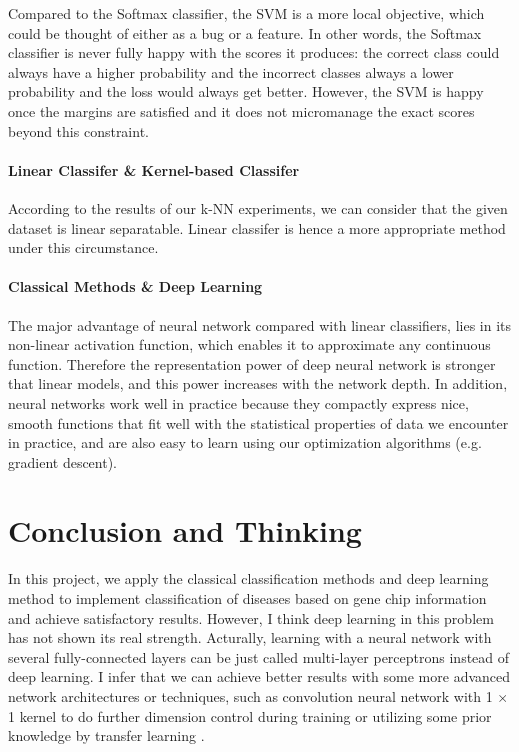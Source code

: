 \documentclass[10pt,twocolumn,letterpaper]{article}
\begin{document}
	Compared to the Softmax classifier, the SVM is a more local objective, which could be thought of either as a bug or a feature. In other words, the Softmax classifier is never fully happy with the scores it produces: the correct class could always have a higher probability and the incorrect classes always a lower probability and the loss would always get better. However, the SVM is happy once the margins are satisfied and it does not micromanage the exact scores beyond this constraint.
	
	\paragraph{Linear Classifer \& Kernel-based Classifer}
	According to the results of our k-NN experiments, we can consider that the given dataset is linear separatable. Linear classifer is hence a more appropriate method under this circumstance.
	
	\paragraph{Classical Methods \& Deep Learning} The major advantage of neural network compared with linear classifiers, lies in its non-linear activation function, which enables it to approximate any continuous function. Therefore the representation power of deep neural network is stronger that linear models, and this power increases with the network depth. In addition, neural networks work well in practice because they compactly express nice, smooth functions that fit well with the statistical properties of data we encounter in practice, and are also easy to learn using our optimization algorithms (e.g. gradient descent).


\section{Conclusion and Thinking}
	In this project, we apply the classical classification methods and deep learning method to implement classification of diseases based on gene chip information and achieve satisfactory results. However, I think deep learning in this problem has not shown its real strength. Acturally, learning with a neural network with several fully-connected layers can be just called multi-layer perceptrons instead of deep learning. I infer that we can achieve better results with some more advanced network architectures or techniques, such as convolution neural network with 1 $\times$ 1 kernel to do further dimension control during training or utilizing some prior knowledge by transfer learning \cite{transferLearning}.
\end{document}
